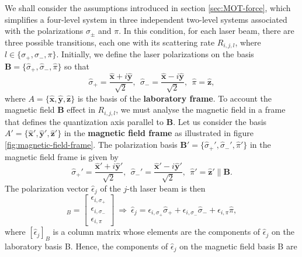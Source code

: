 We shall consider the assumptions introduced in section \ref{sec:MOT-force}, which simplifies a four-level system in three independent two-level systems associated with the polarizations $ \sigma_{\pm} $ and $ \pi $. In this condition, for each laser beam, there are three possible transitions, each one with its scattering rate $ R_{i,j,l} $, where $ l \in \{\sigma_{+}, \sigma_{-}, \pi \} $. Initially, we define the laser polarizations on the basis $ \mathbf{B} = \{\hat{\sigma}_{+}, \hat{\sigma}_{-}, \hat{\pi} \} $ so that
\begin{equation}
    \hat{\sigma}_+ = \frac{\mathbf{\hat{x}} + i\mathbf{\hat{y}}}{\sqrt{2}},\ \ \hat{\sigma}_- = \frac{\mathbf{\hat{x}} - i\mathbf{\hat{y}}}{\sqrt{2}},\ \ \hat{\pi} = \mathbf{\hat{z}},
\end{equation}
where $ A = \{\mathbf{\hat{x}}, \mathbf{\hat{y}}, \mathbf{\hat{z}}\} $ is the basis of the \textbf{laboratory frame}. To account the magnetic field $ \mathbf{B} $ effect in $ R_{i,j,l} $, we must analyse the magnetic field in a frame that defines the quantization axis parallel to $ \mathbf{B} $. Let us consider the basis $ A' = \{\mathbf{\hat{x}}', \mathbf{\hat{y}}', \mathbf{\hat{z}}'\} $ in the \textbf{magnetic field frame} as illustrated in figure \ref{fig:magnetic-field-frame}. The polarization basis $ \mathbf{B}' = \{\hat{\sigma}_{+}', \hat{\sigma}_{-}', \hat{\pi}' \} $ in the magnetic field frame is given by
\begin{equation}
    \hat{\sigma}_+' = \frac{\mathbf{\hat{x}'} + i\mathbf{\hat{y}}'}{\sqrt{2}},\ \ \hat{\sigma}_-' = \frac{\mathbf{\hat{x}'} - i\mathbf{\hat{y}}'}{\sqrt{2}},\ \ \hat{\pi}' = \mathbf{\hat{z}}' \| \mathbf{B}.
\end{equation}
The polarization vector $ \hat{\epsilon}_j $ of the $ j $-th laser beam is then
\begin{equation}
    [\hat{\epsilon}_j]_B = \left[ \begin{matrix} \epsilon_{i,\sigma_+} \\ \epsilon_{i,\sigma_-} \\ \epsilon_{i,\pi} \end{matrix} \right]\ \Rightarrow\ \hat{\epsilon}_j = \epsilon_{i,\sigma_+} \hat{\sigma}_{+} + \epsilon_{i,\sigma_-} \hat{\sigma}_{-} +  \epsilon_{i,\pi} \hat{\pi},
\end{equation}
where $ [\hat{\epsilon}_j]_B $ is a column matrix whose elements are the components of $ \hat{\epsilon}_j $ on the laboratory basis B. Hence, the components of $ \hat{\epsilon}_j $ on the magnetic field basis B are
